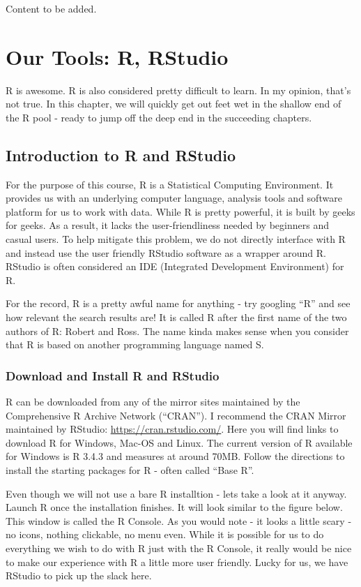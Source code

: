 \documentclass[]{krantz}
\theoremstyle{definition}
\theoremstyle{definition}
\theoremstyle{definition}
\theoremstyle{remark}
\begin{document}
Content to be added.

\chapter{Our Tools: R, RStudio}\label{our-tools-r-rstudio}

R is awesome. R is also considered pretty difficult to learn. In my
opinion, that's not true. In this chapter, we will quickly get out feet
wet in the shallow end of the R pool - ready to jump off the deep end in
the succeeding chapters.

\section{Introduction to R and
RStudio}\label{introduction-to-r-and-rstudio}

For the purpose of this course, R is a Statistical Computing
Environment. It provides us with an underlying computer language,
analysis tools and software platform for us to work with data. While R
is pretty powerful, it is built by geeks for geeks. As a result, it
lacks the user-friendliness needed by beginners and casual users. To
help mitigate this problem, we do not directly interface with R and
instead use the user friendly RStudio software as a wrapper around R.
RStudio is often considered an IDE (Integrated Development Environment)
for R.

For the record, R is a pretty awful name for anything - try googling
``R'' and see how relevant the search results are! It is called R after
the first name of the two authors of R: Robert and Ross. The name kinda
makes sense when you consider that R is based on another programming
language named S.

\subsection{Download and Install R and
RStudio}\label{download-and-install-r-and-rstudio}

R can be downloaded from any of the mirror sites maintained by the
Comprehensive R Archive Network (``CRAN''). I recommend the CRAN Mirror
maintained by RStudio: \url{https://cran.rstudio.com/}. Here you will
find links to download R for Windows, Mac-OS and Linux. The current
version of R available for Windows is R 3.4.3 and measures at around
70MB. Follow the directions to install the starting packages for R -
often called ``Base R''.

Even though we will not use a bare R installtion - lets take a look at
it anyway. Launch R once the installation finishes. It will look similar
to the figure below. This window is called the R Console. As you would
note - it looks a little scary - no icons, nothing clickable, no menu
even. While it is possible for us to do everything we wish to do with R
just with the R Console, it really would be nice to make our experience
with R a little more user friendly. Lucky for us, we have RStudio to
pick up the slack here.
\end{document}
